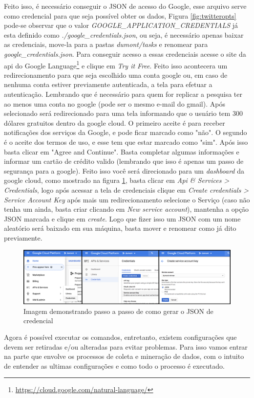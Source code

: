 Feito isso, é necessário conseguir o JSON de acesso do Google, esse arquivo serve como credencial para que seja possível obter os dados, Figura \ref{fig:twitteropts} pode-se observar que o valor \textit{GOOGLE\_APPLICATION\_CREDENTIALS} já esta definido como \textit{./google\_credentials.json}, ou seja, é necessário apenas baixar as credenciais, move-la para a pastas \textit{dumont/tasks} e renomear para \textit{google\_credentials.json}. Para conseguir acesso a essas credenciais acesse o site da api do Google Language\footnote{\url{https://cloud.google.com/natural-language/}} e clique em \textit{Try it Free}. Feito isso acontecera um redirecionamento para que seja escolhido uma conta google ou, em caso de nenhuma conta estiver previamente autenticada, a tela para efetuar a autenticação. Lembrando que é necessário para quem for replicar a pesquisa ter ao menos uma conta no google (pode ser o mesmo e-mail do gmail). Após selecionado será redirecionado para uma tela informando que o usuário tem 300 dólares gratuitos dentro da google cloud. O primeiro aceite é para receber notificações dos serviços da Google, e pode ficar marcado como "não". O segundo é o aceite dos termos de uso, e esse tem que estar marcado como "sim". Após isso basta clicar em "Agree and Continue". Basta completar algumas informações e informar um cartão de crédito valido (lembrando que isso é apenas um passo de segurança para a google). Feito isso você será direcionado para um \textit{dashboard} da google cloud, como mostrado na figura \ref{fig:googleflow}, basta clicar em \textit{Api \& Services > Credentials}, logo após acessar a tela de credenciais clique em \textit{Create credentials > Service Account Key} após mais um redirecionamento selecione o Serviço (caso não tenha um ainda, basta criar clicando em \textit{New service account}), mantenha a opção JSON marcada e clique em \textit{create}. Logo que fizer isso um JSON com um nome aleatório será baixado em sua máquina, basta mover e renomear como já dito previamente.

\begin{figure}
    \centering
    \includegraphics[width=1\textwidth]{imagens/googleflow.png}
    \caption{Imagem demonstrando passo a passo de como gerar o JSON de credencial}
    \label{fig:googleflow}
\end{figure}

Agora é possível executar os comandos, entretanto, existem configurações que devem ser retiradas e/ou alteradas para evitar problemas. Para isso vamos entrar na parte que envolve os processos de coleta e mineração de dados, com o intuito de entender as ultimas configurações e como todo o processo é executado.
